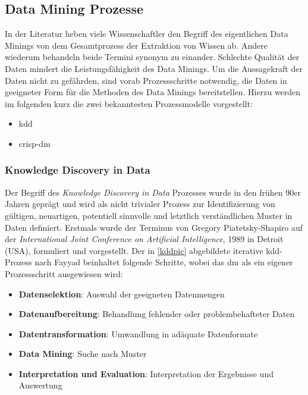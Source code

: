 \subsection{Data Mining Prozesse}
\label{prozdm}

In der Literatur heben viele Wissenschaftler den Begriff des eigentlichen Data Minings von dem Gesamtprozess der Extraktion von Wissen ab. Andere wiederum behandeln beide Termini synonym zu einander. Schlechte Qualität der Daten mindert die Leistungsfähigkeit des Data Minings. Um die Aussagekraft der Daten nicht zu gefährden, sind vorab Prozessschritte notwendig, die Daten in geeigneter Form für die Methoden des Data Minings bereitstellen.  Hierzu werden im folgenden kurz die zwei bekanntesten Prozessmodelle vorgestellt:

\begin{itemize}
\item \gls{kdd}
\item \gls{crisp-dm}
\end{itemize}

\subsubsection{Knowledge Discovery in Data}

Der Begriff des \textit{Knowledge Discovery in Data} Prozesses wurde in den frühen 90er Jahren geprägt und wird als \glqq nicht trivialer Prozess zur Identifizierung von gültigen, neuartigen, potentiell sinnvolle und letztlich verständlichen Muster in Daten\grqq{} definiert. Erstmals wurde der Terminus von Gregory Piatetsky-Shapiro auf der \textit{International Joint Conference on Artificial Intelligence}, 1989 in Detroit (USA), formuliert und vorgestellt. Der in \vref{kddpic} abgebildete iterative \gls{kdd}-Prozess nach Fayyad beinhaltet folgende Schritte, wobei das \gls{dm} als ein eigener Prozessschritt ausgewiesen wird:

\begin{itemize}
\item \textbf{Datenselektion}: Auswahl der geeigneten Datenmengen
\item \textbf{Datenaufbereitung}: Behandlung fehlender oder problembehafteter Daten
\item \textbf{Datentransformation}: Umwandlung in adäquate Datenformate
\item \textbf{Data Mining}: Suche nach Muster
\item \textbf{Interpretation und Evaluation}: Interpretation der Ergebnisse und Auswertung
\end{itemize}

